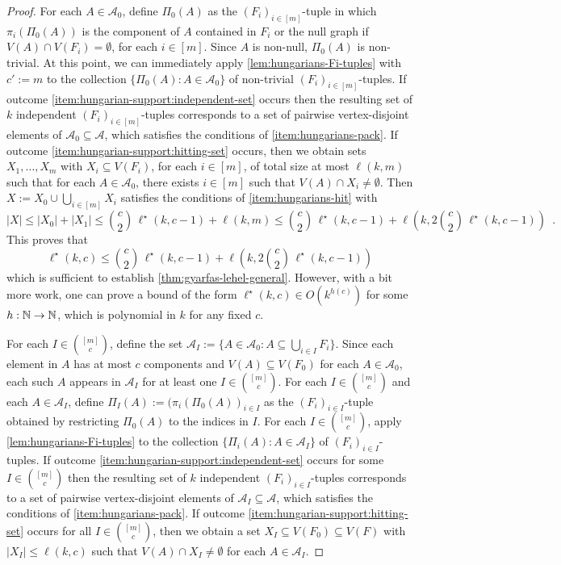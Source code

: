 \documentclass{patmorin}
\begin{document}
\begin{proof}
  For each $A\in\mathcal{A}_0$, define $\Pi_0(A)$ as the $(F_i)_{i\in[m]}$-tuple in which $\pi_i(\Pi_0(A))$ is the component of $A$ contained in $F_i$ or the null graph if $V(A)\cap V(F_i)=\emptyset$, for each $i\in[m]$.  Since $A$ is non-null, $\Pi_0(A)$ is non-trivial. At this point, we can immediately apply \cref{lem:hungarians-Fi-tuples} with $c':=m$ to the collection $\{\Pi_0(A):A\in \mathcal{A}_0\}$ of non-trivial $(F_i)_{i\in[m]}$-tuples.  If outcome \cref{item:hungarian-support:independent-set} occurs then the resulting set of $k$ independent $(F_i)_{i\in[m]}$-tuples corresponds to a set of pairwise vertex-disjoint elements of $\mathcal{A}_0\subseteq \mathcal{A}$, which satisfies the conditions of \cref{item:hungarians-pack}.  If outcome \cref{item:hungarian-support:hitting-set} occurs, then we obtain sets $X_1,\ldots,X_m$ with $X_i\subseteq V(F_i)$, for each $i\in[m]$, of total size at most $\ell(k,m)$ such that for each $A\in\mathcal{A}_0$, there exists $i\in[m]$ such that $V(A)\cap X_i\neq\emptyset$.  Then $X:=X_0\cup \bigcup_{i\in[m]}X_i$ satisfies the conditions of \cref{item:hungarians-hit} with
  \[
     \textstyle |X|\le |X_0|+|X_1|\le \binom{c}{2}\,\ell^\star(k,c-1) + \ell(k,m)
     \le \binom{c}{2}\,\ell^\star(k,c-1) + \ell(k,2\binom{c}{2}\,\ell^\star(k,c-1)) \enspace .
  \]
  This proves that
  \[  \textstyle \ell^\star(k,c) \le \binom{c}{2}\,\ell^\star(k,c-1) + \ell(k,2\binom{c}{2}\,\ell^\star(k,c-1)) \]
  which is sufficient to establish \cref{thm:gyarfas-lehel-general}.  However, with a bit more work, one can prove a bound of the form $\ell^\star(k,c)\in O(k^{h(c)})$ for some $h:\mathbb{N}\to\mathbb{N}$, which is polynomial in $k$ for any fixed $c$.

  For each $I\in\binom{[m]}{c}$, define the set $\mathcal{A}_I:=\{A\in\mathcal{A}_0:A\subseteq \bigcup_{i\in I}F_i\}$.  Since each element in $A$ has at most $c$ components and $V(A)\subseteq V(F_0)$ for each $A\in \mathcal{A}_0$, each such $A$ appears in $\mathcal{A}_I$ for at least one $I\in\binom{[m]}{c}$.  For each $I\in\binom{[m]}{c}$ and each $A\in\mathcal{A}_I$, define $\Pi_I(A):=(\pi_i(\Pi_0(A))_{i\in I}$ as the $(F_i)_{i\in I}$-tuple obtained by restricting $\Pi_0(A)$ to the indices in $I$.  For each $I\in\binom{[m]}{c}$, apply \cref{lem:hungarians-Fi-tuples} to the collection $\{\Pi_i(A):A\in \mathcal{A}_I\}$ of $(F_i)_{i\in I}$-tuples.  If outcome \cref{item:hungarian-support:independent-set} occurs for some $I\in\binom{[m]}{c}$ then the resulting set of $k$ independent $(F_i)_{i\in I}$-tuples corresponds to a set of pairwise vertex-disjoint elements of $\mathcal{A}_I\subseteq \mathcal{A}$, which satisfies the conditions of \cref{item:hungarians-pack}.  If outcome \cref{item:hungarian-support:hitting-set} occurs for all $I\in\binom{[m]}{c}$, then we obtain a set $X_I\subseteq V(F_0)\subseteq V(F)$ with $|X_I|\le \ell(k,c)$ such that $V(A)\cap X_I\neq\emptyset$ for each $A\in\mathcal{A}_I$.


\end{proof}
\end{document}
